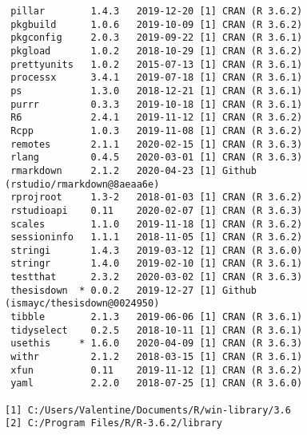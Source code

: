 \documentclass[12pt,twoside]{reedthesis}
\begin{document}
\begin{verbatim}
 pillar        1.4.3   2019-12-20 [1] CRAN (R 3.6.2)                    
 pkgbuild      1.0.6   2019-10-09 [1] CRAN (R 3.6.2)                    
 pkgconfig     2.0.3   2019-09-22 [1] CRAN (R 3.6.1)                    
 pkgload       1.0.2   2018-10-29 [1] CRAN (R 3.6.2)                    
 prettyunits   1.0.2   2015-07-13 [1] CRAN (R 3.6.1)                    
 processx      3.4.1   2019-07-18 [1] CRAN (R 3.6.1)                    
 ps            1.3.0   2018-12-21 [1] CRAN (R 3.6.1)                    
 purrr         0.3.3   2019-10-18 [1] CRAN (R 3.6.1)                    
 R6            2.4.1   2019-11-12 [1] CRAN (R 3.6.2)                    
 Rcpp          1.0.3   2019-11-08 [1] CRAN (R 3.6.2)                    
 remotes       2.1.1   2020-02-15 [1] CRAN (R 3.6.3)                    
 rlang         0.4.5   2020-03-01 [1] CRAN (R 3.6.3)                    
 rmarkdown     2.1.2   2020-04-23 [1] Github (rstudio/rmarkdown@8aeaa6e)
 rprojroot     1.3-2   2018-01-03 [1] CRAN (R 3.6.2)                    
 rstudioapi    0.11    2020-02-07 [1] CRAN (R 3.6.3)                    
 scales        1.1.0   2019-11-18 [1] CRAN (R 3.6.2)                    
 sessioninfo   1.1.1   2018-11-05 [1] CRAN (R 3.6.2)                    
 stringi       1.4.3   2019-03-12 [1] CRAN (R 3.6.0)                    
 stringr       1.4.0   2019-02-10 [1] CRAN (R 3.6.1)                    
 testthat      2.3.2   2020-03-02 [1] CRAN (R 3.6.3)                    
 thesisdown  * 0.0.2   2019-12-27 [1] Github (ismayc/thesisdown@0024950)
 tibble        2.1.3   2019-06-06 [1] CRAN (R 3.6.1)                    
 tidyselect    0.2.5   2018-10-11 [1] CRAN (R 3.6.1)                    
 usethis     * 1.6.0   2020-04-09 [1] CRAN (R 3.6.3)                    
 withr         2.1.2   2018-03-15 [1] CRAN (R 3.6.1)                    
 xfun          0.11    2019-11-12 [1] CRAN (R 3.6.2)                    
 yaml          2.2.0   2018-07-25 [1] CRAN (R 3.6.0)                    

[1] C:/Users/Valentine/Documents/R/win-library/3.6
[2] C:/Program Files/R/R-3.6.2/library
\end{verbatim}

\end{document}
